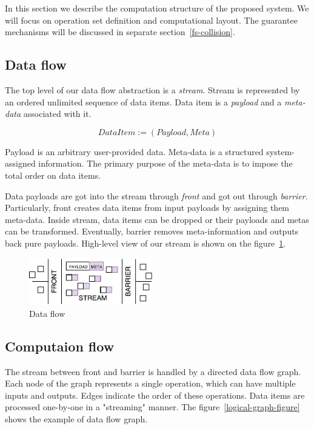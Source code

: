 
\label {fs-model}
In this section we describe the computation structure of the proposed system. We will focus on operation set definition and computational layout. The guarantee mechanisms will be discussed in separate section~\ref{fs-collision}.

\subsection{Data flow}

The top level of our data flow abstraction is a {\it stream}. Stream is represented by an ordered unlimited sequence of data items. Data item is a {\it payload} and a {\it meta-data} associated with it. 

\[DataItem := (Payload, Meta)\]

Payload is an arbitrary user-provided data. Meta-data is a structured system-assigned information. The primary purpose of the meta-data is to impose the total order on data items. 

Data payloads are got into the stream through {\it front} and got out through {\it barrier}. Particularly, front creates data items from input payloads by assigning them meta-data. Inside stream, data items can be dropped or their payloads and metas can be transformed. Eventually, barrier removes meta-information and outputs back pure payloads. High-level view of our stream is shown on the figure~\ref{stream}.

\begin{figure}[htbp]
  \centering
  \includegraphics[width=0.48\textwidth]{pics/stream}
  \caption{Data flow}
  \label {stream}
\end{figure}

\subsection{Computaion flow}

The stream between front and barrier is handled by a directed data flow graph. Each node of the graph represents a single operation, which can have multiple inputs and outputs. Edges indicate the order of these operations. Data items are processed one-by-one in a "streaming" manner. The figure~\ref{logical-graph-figure} shows the example of data flow graph.

